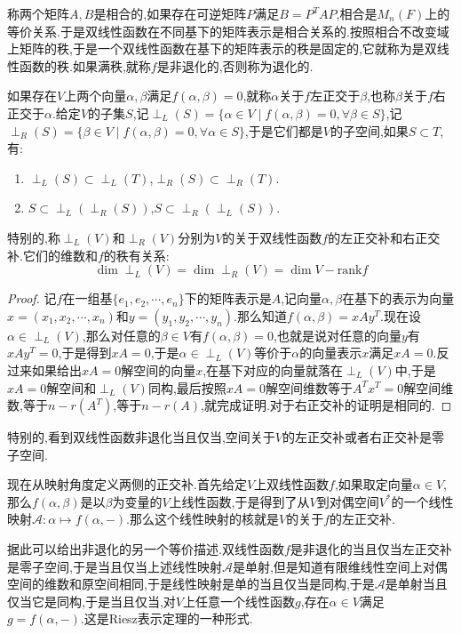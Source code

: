 称两个矩阵$A,B$是相合的,如果存在可逆矩阵$P$满足$B=P^TAP$,相合是$M_n(F)$上的等价关系.于是双线性函数在不同基下的矩阵表示是相合关系的.按照相合不改变域上矩阵的秩,于是一个双线性函数在基下的矩阵表示的秩是固定的,它就称为是双线性函数的秩.如果满秩,就称$f$是非退化的,否则称为退化的.

如果存在$V$上两个向量$\alpha,\beta$满足$f(\alpha,\beta)=0$,就称$\alpha$关于$f$左正交于$\beta$,也称$\beta$关于$f$右正交于$\alpha$.给定$V$的子集$S$,记$\perp_L(S)=\{\alpha\in V\mid f(\alpha,\beta)=0,\forall\beta\in S\}$,记$\perp_R(S)=\{\beta\in V\mid f(\alpha,\beta)=0,\forall\alpha\in S\}$,于是它们都是$V$的子空间,如果$S\subset T$,有:
\begin{enumerate}
	\item $\perp_L(S)\subset\perp_L(T)$,$\perp_R(S)\subset\perp_R(T)$.
	\item $S\subset\perp_L\left(\perp_R(S)\right)$,$S\subset\perp_R\left(\perp_L(S)\right)$.
\end{enumerate}

特别的,称$\perp_L(V)$和$\perp_R(V)$分别为$V$的关于双线性函数$f$的左正交补和右正交补.它们的维数和$f$的秩有关系:
$$\dim\perp_L(V)=\dim\perp_R(V)=\dim V-\mathrm{rank}f$$
\begin{proof}
	
	记$f$在一组基$\{e_1,e_2,\cdots,e_n\}$下的矩阵表示是$A$,记向量$\alpha,\beta$在基下的表示为向量$x=(x_1,x_2,\cdots,x_n)$和$y=(y_1,y_2,\cdots,y_n)$.那么知道$f(\alpha,\beta)=xAy^T$.现在设$\alpha\in\perp_L(V)$,那么对任意的$\beta\in V$有$f(\alpha,\beta)=0$,也就是说对任意的向量$y$有$xAy^T=0$,于是得到$xA=0$,于是$\alpha\in\perp_L(V)$等价于$\alpha$的向量表示$x$满足$xA=0$.反过来如果给出$xA=0$解空间的向量$x$,在基下对应的向量就落在$\perp_L(V)$中,于是$xA=0$解空间和$\perp_L(V)$同构,最后按照$xA=0$解空间维数等于$A^Tx^T=0$解空间维数,等于$n-r(A^T)$,等于$n-r(A)$,就完成证明.对于右正交补的证明是相同的.
	
\end{proof}

特别的,看到双线性函数非退化当且仅当,空间关于$V$的左正交补或者右正交补是零子空间.

现在从映射角度定义两侧的正交补.首先给定$V$上双线性函数$f$,如果取定向量$\alpha\in V$,那么$f(\alpha,\beta)$是以$\beta$为变量的$V$上线性函数,于是得到了从$V$到对偶空间$V^*$的一个线性映射$\mathscr{A}:\alpha\mapsto f(\alpha,-)$.那么这个线性映射的核就是$V$的关于$f$的左正交补.

据此可以给出非退化的另一个等价描述.双线性函数$f$是非退化的当且仅当左正交补是零子空间,于是当且仅当上述线性映射$\mathscr{A}$是单射,但是知道有限维线性空间上对偶空间的维数和原空间相同,于是线性映射是单的当且仅当是同构,于是$\mathscr{A}$是单射当且仅当它是同构,于是当且仅当,对$V$上任意一个线性函数$g$,存在$\alpha\in V$满足$g=f(\alpha,-)$.这是Riesz表示定理的一种形式.

